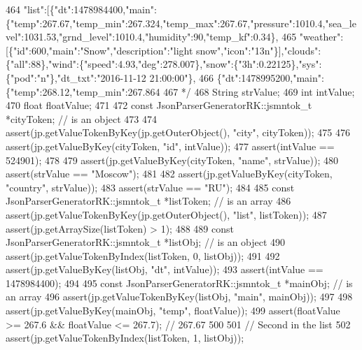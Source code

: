 \begin{DoxyCode}
{{{{{{464 \textcolor{comment}{            
      "list":[\{"dt":1478984400,"main":\{"temp":267.67,"temp\_min":267.324,"temp\_max":267.67,"pressure":1010.4,"sea\_level":1031.53,"grnd\_level":1010.4,"humidity":90,"temp\_kf":0.34\},}
465 \textcolor{comment}{                "weather":[\{"id":600,"main":"Snow","description":"light
       snow","icon":"13n"\}],"clouds":\{"all":88\},"wind":\{"speed":4.93,"deg":278.007\},"snow":\{"3h":0.22125\},"sys":\{"pod":"n"\},"dt\_txt":"2016-11-12
       21:00:00"\},}
466 \textcolor{comment}{            \{"dt":1478995200,"main":\{"temp":268.12,"temp\_min":267.864}
467 \textcolor{comment}{         */}
468         String strValue;
469         \textcolor{keywordtype}{int} intValue;
470         \textcolor{keywordtype}{float} floatValue;
471 
472         \textcolor{keyword}{const} JsonParserGeneratorRK::jsmntok_t *cityToken; \textcolor{comment}{// is an object}
473 
474         assert(jp.getValueTokenByKey(jp.getOuterObject(), \textcolor{stringliteral}{"city"}, cityToken));
475 
476         assert(jp.getValueByKey(cityToken, \textcolor{stringliteral}{"id"}, intValue));
477         assert(intValue == 524901);
478 
479         assert(jp.getValueByKey(cityToken, \textcolor{stringliteral}{"name"}, strValue));
480         assert(strValue == \textcolor{stringliteral}{"Moscow"});
481 
482         assert(jp.getValueByKey(cityToken, \textcolor{stringliteral}{"country"}, strValue));
483         assert(strValue == \textcolor{stringliteral}{"RU"});
484 
485         \textcolor{keyword}{const} JsonParserGeneratorRK::jsmntok_t *listToken; \textcolor{comment}{// is an array}
486         assert(jp.getValueTokenByKey(jp.getOuterObject(), \textcolor{stringliteral}{"list"}, listToken));
487         assert(jp.getArraySize(listToken) > 1);
488 
489         \textcolor{keyword}{const} JsonParserGeneratorRK::jsmntok_t *listObj; \textcolor{comment}{// is an object}
490         assert(jp.getValueTokenByIndex(listToken, 0, listObj));
491 
492         assert(jp.getValueByKey(listObj, \textcolor{stringliteral}{"dt"}, intValue));
493         assert(intValue == 1478984400);
494 
495         \textcolor{keyword}{const} JsonParserGeneratorRK::jsmntok_t *mainObj; \textcolor{comment}{// is an array}
496         assert(jp.getValueTokenByKey(listObj, \textcolor{stringliteral}{"main"}, mainObj));
497 
498         assert(jp.getValueByKey(mainObj, \textcolor{stringliteral}{"temp"}, floatValue));
499         assert(floatValue >= 267.6 && floatValue <= 267.7); \textcolor{comment}{// 267.67}
500 
501         \textcolor{comment}{// Second in the list}
502         assert(jp.getValueTokenByIndex(listToken, 1, listObj));
}}}}}}
\end{DoxyCode}
